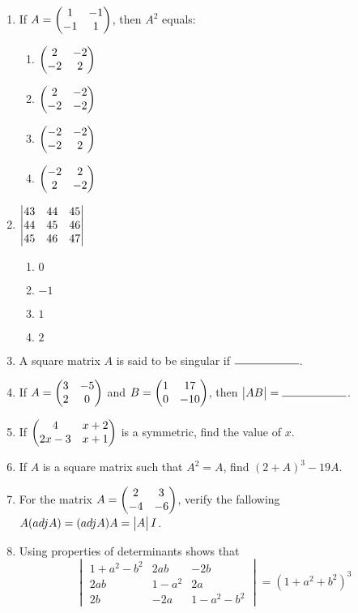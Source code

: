 \documentclass{article}
\begin{document}
\begin{enumerate}

    \item If $A = \begin{pmatrix}1 & -1 \\ -1 & 1\end{pmatrix}$, then $A^2$ equals:
    \begin{enumerate}
        \item $\begin{pmatrix}2 & -2 \\ -2 & 2\end{pmatrix}$
        \item $\begin{pmatrix}2 & -2 \\ -2 & -2\end{pmatrix}$
        \item $\begin{pmatrix}-2 & -2 \\ -2 & 2\end{pmatrix}$
        \item $\begin{pmatrix}-2 & 2 \\ 2 & -2\end{pmatrix}$
    \end{enumerate}

    \item $\begin{vmatrix}43 & 44 & 45 \\ 44 & 45 & 46 \\ 45 & 46 & 47\end{vmatrix}$
    \begin{enumerate}
        \item $0$
        \item $-1$
        \item $1$
        \item $2$
    \end{enumerate}

    \item A square matrix $A$ is said to be singular if $\rule{2cm}{0.15mm}$.
    
    \item If $A =\begin{pmatrix}3 & -5 \\ 2 & 0\end{pmatrix}$ and $B = \begin{pmatrix}1 & 17 \\ 0 & -10\end{pmatrix}$, then $\mydet{AB} = \rule{2cm}{0.15mm}$.
    
    \item If $\begin{pmatrix}4 & x+2 \\ 2x-3 & x+1\end{pmatrix}$ is a symmetric, find the value of $x$.
    
    \item If $A$ is a square matrix such that $A^2 = A$, find $(2+A)^3 - 19A$.

    \item For the matrix $A = \begin{pmatrix}2 & 3 \\ -4 & -6\end{pmatrix}$, verify the fallowing $A(adj A) = (adj A)A = \begin{vmatrix}A\end{vmatrix}I$.

    \item Using properties of determinants shows that
	    \[
    		\begin{vmatrix}
        		1 + a^2 - b^2 & 2ab & -2b \\
        		2ab & 1 - a^2 & 2a \\
        		2b & -2a & 1 - a^2 - b^2
    		\end{vmatrix} = (1 + a^2 + b^2)^3
	    \]


\end{enumerate}
\end{document}
